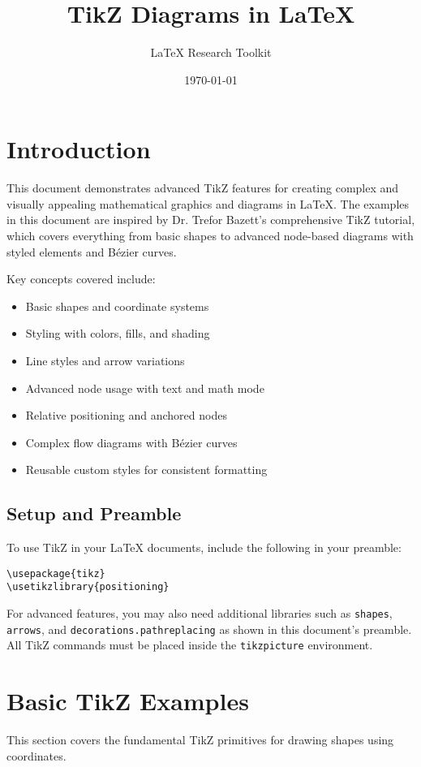 \documentclass{article}
\title{TikZ Diagrams in LaTeX}
\author{LaTeX Research Toolkit}
\date{\today}
\begin{document}
\maketitle

\section*{Introduction}
This document demonstrates advanced TikZ features for creating complex and visually appealing mathematical graphics and diagrams in \LaTeX. The examples in this document are inspired by Dr. Trefor Bazett's comprehensive TikZ tutorial, which covers everything from basic shapes to advanced node-based diagrams with styled elements and B\'ezier curves.

Key concepts covered include:
\begin{itemize}
    \item Basic shapes and coordinate systems
    \item Styling with colors, fills, and shading
    \item Line styles and arrow variations
    \item Advanced node usage with text and math mode
    \item Relative positioning and anchored nodes
    \item Complex flow diagrams with B\'ezier curves
    \item Reusable custom styles for consistent formatting
\end{itemize}

\subsection*{Setup and Preamble}
To use TikZ in your \LaTeX{} documents, include the following in your preamble:
\begin{verbatim}
\usepackage{tikz}
\usetikzlibrary{positioning}
\end{verbatim}

For advanced features, you may also need additional libraries such as \texttt{shapes}, \texttt{arrows}, and \texttt{decorations.pathreplacing} as shown in this document's preamble. All TikZ commands must be placed inside the \texttt{tikzpicture} environment.

\section{Basic TikZ Examples}
This section covers the fundamental TikZ primitives for drawing shapes using coordinates.
\end{document}
